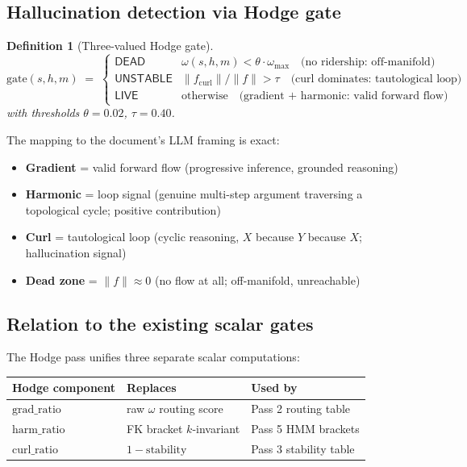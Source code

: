 \documentclass[11pt,a4paper]{article}
\newtheorem{definition}[theorem]{Definition}
\begin{document}
\subsection{Hallucination detection via Hodge gate}

\begin{definition}[Three-valued Hodge gate]
\[
  \mathrm{gate}(s,h,m) \;=\;
  \begin{cases}
    \mathsf{DEAD}     & \omega(s,h,m) < \theta \cdot \omega_{\max}
                        \quad\text{(no ridership: off-manifold)} \\
    \mathsf{UNSTABLE} & \|f_{\mathrm{curl}}\|/\|f\| > \tau
                        \quad\text{(curl dominates: tautological loop)} \\
    \mathsf{LIVE}     & \text{otherwise}
                        \quad\text{(gradient + harmonic: valid forward flow)}
  \end{cases}
\]
with thresholds $\theta = 0.02$, $\tau = 0.40$.
\end{definition}

The mapping to the document's LLM framing is exact:
\begin{itemize}
  \item \textbf{Gradient} = valid forward flow (progressive inference,
        grounded reasoning)
  \item \textbf{Harmonic} = loop signal (genuine multi-step argument
        traversing a topological cycle; positive contribution)
  \item \textbf{Curl} = tautological loop (cyclic reasoning,
        $X$ because $Y$ because $X$; hallucination signal)
  \item \textbf{Dead zone} = $\|f\| \approx 0$
        (no flow at all; off-manifold, unreachable)
\end{itemize}

\subsection{Relation to the existing scalar gates}

The Hodge pass unifies three separate scalar computations:

\begin{center}
\renewcommand{\arraystretch}{1.3}
\begin{tabular}{lll}
\toprule
Hodge component & Replaces & Used by \\
\midrule
$\mathrm{grad\_ratio}$ & raw $\omega$ routing score & Pass 2 routing table \\
$\mathrm{harm\_ratio}$ & FK bracket $k$-invariant & Pass 5 HMM brackets \\
$\mathrm{curl\_ratio}$ & $1 - \mathrm{stability}$ & Pass 3 stability table \\
\bottomrule
\end{tabular}
\end{center}
\end{document}
